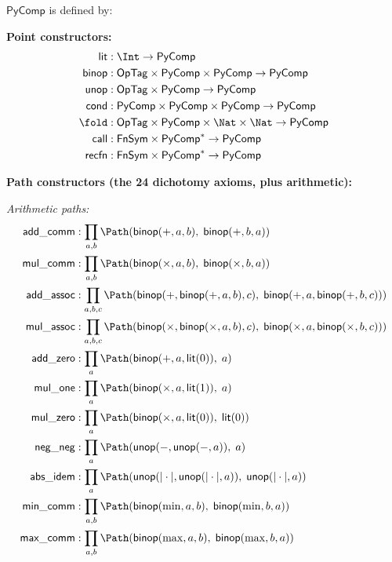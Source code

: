 \begin{definition}
\label{def:pycomp}
$\mathsf{PyComp}$ is defined by:

\medskip
\textbf{Point constructors:}
\begin{align}
  \mathsf{lit} &: \Int \to \mathsf{PyComp} \\
  \mathsf{binop} &: \mathsf{OpTag} \times \mathsf{PyComp} \times
    \mathsf{PyComp} \to \mathsf{PyComp} \\
  \mathsf{unop} &: \mathsf{OpTag} \times \mathsf{PyComp} \to
    \mathsf{PyComp} \\
  \mathsf{cond} &: \mathsf{PyComp} \times \mathsf{PyComp} \times
    \mathsf{PyComp} \to \mathsf{PyComp} \\
  \fold &: \mathsf{OpTag} \times \mathsf{PyComp} \times \Nat \times
    \Nat \to \mathsf{PyComp} \\
  \mathsf{call} &: \mathsf{FnSym} \times \mathsf{PyComp}^* \to
    \mathsf{PyComp} \\
  \mathsf{recfn} &: \mathsf{FnSym} \times \mathsf{PyComp}^* \to
    \mathsf{PyComp}
\end{align}

\textbf{Path constructors (the 24 dichotomy axioms, plus arithmetic):}

\emph{Arithmetic paths:}
\begin{align}
  \mathsf{add\_comm} &: \prod_{a,b} \Path(\mathsf{binop}(+, a, b),\;
    \mathsf{binop}(+, b, a)) \\
  \mathsf{mul\_comm} &: \prod_{a,b} \Path(\mathsf{binop}(\times, a, b),\;
    \mathsf{binop}(\times, b, a)) \\
  \mathsf{add\_assoc} &: \prod_{a,b,c} \Path(
    \mathsf{binop}(+, \mathsf{binop}(+, a, b), c),\;
    \mathsf{binop}(+, a, \mathsf{binop}(+, b, c))) \\
  \mathsf{mul\_assoc} &: \prod_{a,b,c} \Path(
    \mathsf{binop}(\times, \mathsf{binop}(\times, a, b), c),\;
    \mathsf{binop}(\times, a, \mathsf{binop}(\times, b, c))) \\
  \mathsf{add\_zero} &: \prod_a \Path(\mathsf{binop}(+, a,
    \mathsf{lit}(0)),\; a) \\
  \mathsf{mul\_one} &: \prod_a \Path(\mathsf{binop}(\times, a,
    \mathsf{lit}(1)),\; a) \\
  \mathsf{mul\_zero} &: \prod_a \Path(\mathsf{binop}(\times, a,
    \mathsf{lit}(0)),\; \mathsf{lit}(0)) \\
  \mathsf{neg\_neg} &: \prod_a \Path(\mathsf{unop}(-,
    \mathsf{unop}(-, a)),\; a) \\
  \mathsf{abs\_idem} &: \prod_a \Path(\mathsf{unop}(|\cdot|,
    \mathsf{unop}(|\cdot|, a)),\; \mathsf{unop}(|\cdot|, a)) \\
  \mathsf{min\_comm} &: \prod_{a,b} \Path(\mathsf{binop}(\min, a, b),\;
    \mathsf{binop}(\min, b, a)) \\
  \mathsf{max\_comm} &: \prod_{a,b} \Path(\mathsf{binop}(\max, a, b),\;
    \mathsf{binop}(\max, b, a))
\end{align}


\end{definition}
